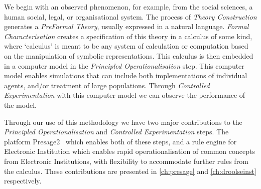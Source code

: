 We begin with an observed phenomenon, for example, from the social sciences, a human social, legal, or organisational system. The process of \emph{Theory Construction} generates a \emph{PreFormal Theory}, usually expressed in a natural language. \emph{Formal Characterisation} creates a specification of this theory in a calculus of some kind, where `calculus' is meant to be any system of calculation or computation based on the manipulation of symbolic representations. This calculus is then embedded in a computer model in the \emph{Principled Operationalisation} step. This computer model enables simulations that can include both implementations of individual agents, and/or treatment of large populations. Through \emph{Controlled Experimentation} with this computer model we can observe the performance of the model.

Through our use of this methodology we have two major contributions to the \emph{Principled Operationalisation} and \emph{Controlled Experimentation} steps. The platform Presage2~\citep{Macbeth2014} which enables both of these steps, and a rule engine for Electronic Institution which enables rapid operationalisation of common concepts from Electronic Institutions, with flexibility to accommodate further rules from the calculus. These contributions are presented in \autoref{ch:presage} and \autoref{ch:droolseinst} respectively.
